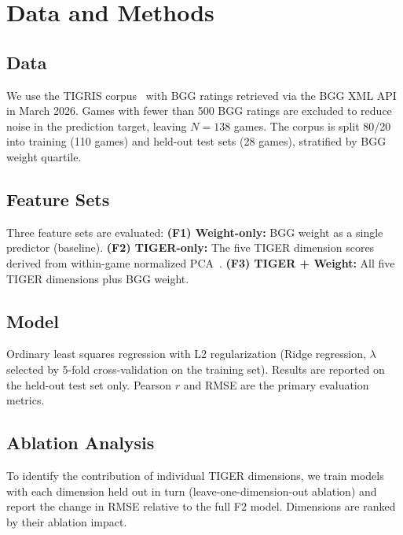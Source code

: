 \section{Data and Methods}
\label{sec:method}

\subsection{Data}

We use the TIGRIS corpus~\cite{dellaLibera2026corpus} with BGG ratings retrieved via
the BGG XML API in March 2026. Games with fewer than 500 BGG ratings are excluded
to reduce noise in the prediction target, leaving $N = 138$ games. The corpus is split
80/20 into training (110 games) and held-out test sets (28 games), stratified by BGG
weight quartile.

\subsection{Feature Sets}

Three feature sets are evaluated:
\textbf{(F1) Weight-only:} BGG weight as a single predictor (baseline).
\textbf{(F2) TIGER-only:} The five TIGER dimension scores derived from within-game
normalized PCA~\cite{dellaLibera2026pca}.
\textbf{(F3) TIGER + Weight:} All five TIGER dimensions plus BGG weight.

\subsection{Model}

Ordinary least squares regression with L2 regularization (Ridge regression, $\lambda$
selected by 5-fold cross-validation on the training set). Results are reported on the
held-out test set only. Pearson $r$ and RMSE are the primary evaluation metrics.

\subsection{Ablation Analysis}

To identify the contribution of individual TIGER dimensions, we train models with each
dimension held out in turn (leave-one-dimension-out ablation) and report the change in
RMSE relative to the full F2 model. Dimensions are ranked by their ablation impact.
